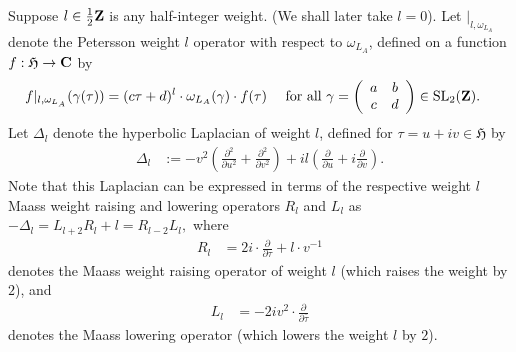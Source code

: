 \documentclass{amsart}
\theoremstyle{definition}
\begin{document}
Suppose $l \in \frac{1}{2}{\bf{Z}}$ is any half-integer weight. (We shall later take $l=0$).
Let $\vert_{l, \omega_{L_A}}$ denote the Petersson weight $l$ operator with respect to $\omega_{L_A}$,  
defined on a function $f: \mathfrak{H}\rightarrow {\bf{C}}$ by   
\begin{align*} f\vert_{l, \omega_{L_A}}(\gamma(\tau)) 
&= (c \tau + d)^l \cdot \omega_{L_A}(\gamma) \cdot f(\tau) 
\quad \text{ for all $\gamma = \left(\begin{array}{cc} a & b \\ c & d\end{array} \right) \in \operatorname{SL}_2({\bf{Z}})$}. \end{align*}
Let $\Delta_l$ denote the hyperbolic Laplacian of weight $l$, defined for $\tau = u + iv \in \mathfrak{H}$ by 
\begin{align*} \Delta_l  
&:= - v^2 \left( \frac{\partial^2}{\partial u^2} + \frac{\partial^2}{\partial v^2} \right) + i l \left( \frac{\partial}{\partial u} + i \frac{\partial}{\partial v}\right). \end{align*}
Note that this Laplacian can be expressed in terms of the respective weight $l$ 
Maass weight raising and lowering operators $R_l$ and $L_l$ 
as $- \Delta_l = L_{l+2} R_l + l = R_{l-2} L_l,$ where 
\begin{align}\label{Rl} R_l &= 2 i \cdot \frac{\partial}{ \partial \tau} + l \cdot v^{-1} \end{align}
denotes the Maass weight raising operator of weight $l$ (which raises the weight by $2$), 
and 
\begin{align}\label{Ll}  L_l &= - 2 i v^2 \cdot \frac{\partial}{ \partial \overline{\tau}} \end{align}
denotes the Maass lowering operator (which lowers the weight $l$ by $2$).
 
\end{document}
